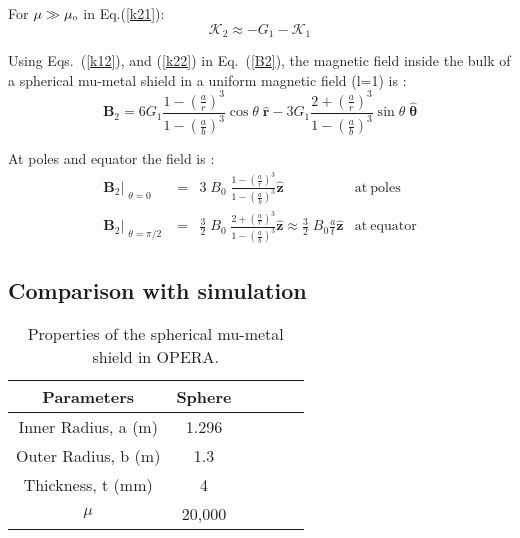 For \(\mu\gg\mu_{\scriptscriptstyle 0}\) in Eq.(\ref{k21}):
\begin{equation}\label{k22}
\mathcal{K}_2\approx-G_1-\mathcal{K}_1
\end{equation}

Using Eqs.~(\ref{k12}), and (\ref{k22}) in Eq.~(\ref{B2}), the magnetic field inside the bulk of a spherical mu-metal shield in a uniform magnetic field (l=1) is :
\begin{equation}
    \bm{B}_2=6 G_1\frac{1-\left(\frac{a}{r}\right)^3}{1-\left(\frac{a}{b}\right)^3}\cos\theta\;\bm{\hat{r}}-3 G_1\frac{2+\left(\frac{a}{r}\right)^3}{1-\left(\frac{a}{b}\right)^3}\sin\theta\;\bm{\hat{\theta}}
\end{equation}

At poles and equator the field is :
\begin{align}
    &\bm{B}_2\Bigr|_{\substack{\theta=0}} &=& 3\;B_0\;\frac{1-\left(\frac{a}{r}\right)^3}{1-\left(\frac{a}{b}\right)^3}\bm{\hat{z}}&\mathrm{at~poles}&\\
    &\bm{B}_2\Bigr|_{\substack{\theta=\pi/2}} &=& \frac{3}{2}\;B_0\;\frac{2+\left(\frac{a}{r}\right)^3}{1-\left(\frac{a}{b}\right)^3}\bm{\hat{z}}\approx \frac{3}{2}\;B_0\frac{a}{t}\bm{\hat{z}}&\mathrm{at~equator}&
\end{align}

\subsection{Comparison with simulation}
\begin{table} [!tb]
    \centering
    \begin{tabular} { |c|c|c|c|c|c|} 
        \hline
        Parameters & Sphere \\
        \hline\hline
        Inner Radius, a (m) & 1.296\\ 
        \hline
        Outer Radius, b (m) & 1.3 \\ 
        \hline
        Thickness, t (mm) & 4 \\ 
        \hline
        $\mu$  & 20,000 \\ 
        \hline
    \end{tabular}
    \caption{Properties of the spherical mu-metal shield in OPERA.}\label{table:opera_sphere}
\end{table}

